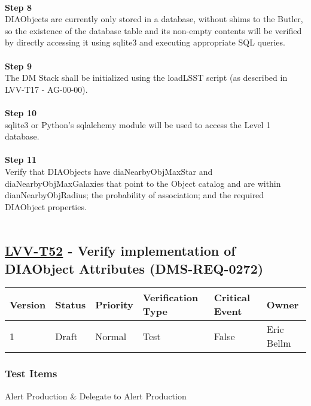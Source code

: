 ~\\
\textbf{Step 8}\\
DIAObjects are currently only stored in a database, without shims to the
Butler, so the existence of the database table and its non-empty
contents will be verified by directly accessing it using sqlite3 and
executing appropriate SQL queries.\\
~\\
\textbf{Step 9}\\
The DM Stack shall be initialized using the loadLSST script (as
described in LVV-T17 - AG-00-00).\\
~\\
\textbf{Step 10}\\
sqlite3 or Python's sqlalchemy module will be used to access the Level 1
database.\\
~\\
\textbf{Step 11}\\
Verify that DIAObjects have diaNearbyObjMaxStar and
diaNearbyObjMaxGalaxies that point to the Object catalog and are within
dianNearbyObjRadius; the probability of association; and the required
DIAObject properties.\\
~\\

\hypertarget{lvv-t52---verify-implementation-of-diaobject-attributes-dms-req-0272}{%
\subsection{\texorpdfstring{\href{https://jira.lsstcorp.org/secure/Tests.jspa\#/testCase/LVV-T52}{LVV-T52}
- Verify implementation of DIAObject Attributes
(DMS-REQ-0272)}{LVV-T52 - Verify implementation of DIAObject Attributes (DMS-REQ-0272)}}\label{lvv-t52---verify-implementation-of-diaobject-attributes-dms-req-0272}}

\begin{longtable}[]{@{}llllll@{}}
\toprule
Version & Status & Priority & Verification Type & Critical Event &
Owner\tabularnewline
\midrule
\endhead
1 & Draft & Normal & Test & False & Eric Bellm\tabularnewline
\bottomrule
\end{longtable}

\hypertarget{test-items-28}{%
\subsubsection{Test Items}\label{test-items-28}}

Alert Production \& Delegate to Alert Production

